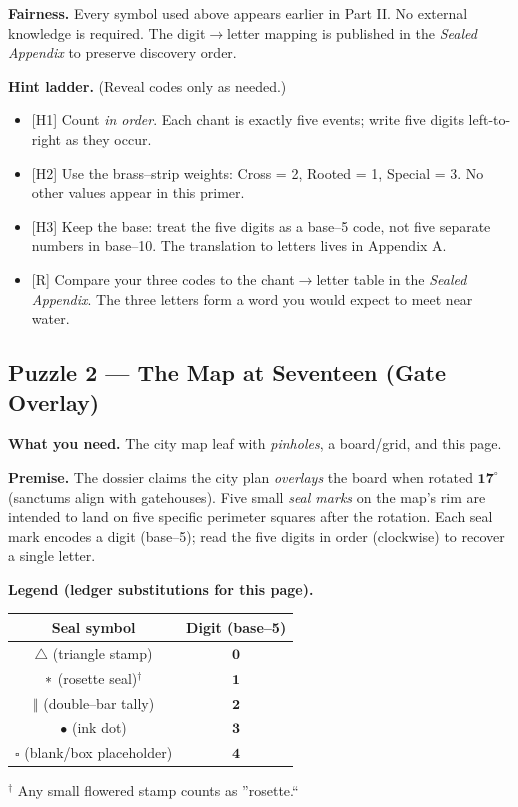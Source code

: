 \documentclass[11pt]{article}
\numberwithin{equation}{section} %
\theoremstyle{plain} %
\theoremstyle{definition} %
\theoremstyle{remark} %
\begin{document}
\medskip
\noindent\textbf{Fairness.} Every symbol used above appears earlier in Part II. No external knowledge is required. The digit\(\to\)letter mapping is published in the \emph{Sealed Appendix} to preserve discovery order.

\medskip
\noindent\textbf{Hint ladder.} (Reveal codes only as needed.)
\begin{itemize}\setlength\itemsep{0.25em}
  \item \textsc{[H1]} Count \emph{in order}. Each chant is exactly five events; write five digits left-to-right as they occur.
  \item \textsc{[H2]} Use the brass--strip weights: Cross = 2, Rooted = 1, Special = 3. No other values appear in this primer.
  \item \textsc{[H3]} Keep the base: treat the five digits as a base--5 code, not five separate numbers in base--10. The translation to letters lives in Appendix A.
  \item \textsc{[R]} Compare your three codes to the chant\(\to\)letter table in the \emph{Sealed Appendix}. The three letters form a word you would expect to meet near water.
\end{itemize}

\subsection{Puzzle 2 --- The Map at Seventeen (Gate Overlay)}
\label{pz:map-at-seventeen}

\noindent\textbf{What you need.} The city map leaf with \emph{pinholes}, a board/grid, and this page.

\medskip
\noindent\textbf{Premise.} The dossier claims the city plan \emph{overlays} the board when rotated \(\mathbf{17^\circ}\) (sanctums align with gatehouses). Five small \emph{seal marks} on the map's rim are intended to land on five specific perimeter squares after the rotation. Each seal mark encodes a digit (base--5); read the five digits in order (clockwise) to recover a single letter.

\medskip
\noindent\textbf{Legend (ledger substitutions for this page).}
\begin{center}
\begin{tabular}{c|c}
\textbf{Seal symbol} & \textbf{Digit (base--5)} \\
\hline
\(\triangle\) (triangle stamp) & \(\mathbf{0}\) \\
\(\large\ast\) (rosette seal)\(^\dagger\) & \(\mathbf{1}\) \\
\(\Vert\) (double--bar tally) & \(\mathbf{2}\) \\
\(\bullet\) (ink dot) & \(\mathbf{3}\) \\
\(\square\) (blank/box placeholder) & \(\mathbf{4}\) \\
\end{tabular}
\end{center}
\noindent\(^\dagger\) Any small flowered stamp counts as ''rosette.``
\end{document}
